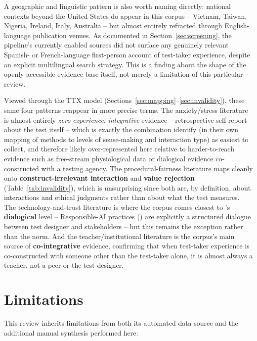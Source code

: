 \documentclass[11pt]{article}
\begin{document}
A geographic and linguistic pattern is also worth naming directly: national contexts beyond the United States do appear in this corpus -- Vietnam, Taiwan, Nigeria, Ireland, Italy, Australia -- but almost entirely refracted through English-language publication venues. As documented in Section~\ref{sec:screening}, the pipeline's currently enabled sources did not surface any genuinely relevant Spanish- or French-language first-person account of test-taker experience, despite an explicit multilingual search strategy. This is a finding about the shape of the openly accessible evidence base itself, not merely a limitation of this particular review.

Viewed through the TTX model (Sections~\ref{sec:mapping}--\ref{sec:invalidity}), these same four patterns reappear in more precise terms. The anxiety/stress literature is almost entirely \emph{zero-experience}, \emph{integrative} evidence -- retrospective self-report about the test itself -- which is exactly the combination \citet{araneda2025ttxmodel} identify (in their own mapping of methods to levels of sense-making and interaction type) as easiest to collect, and therefore likely over-represented here relative to harder-to-reach evidence such as free-stream physiological data or dialogical evidence co-constructed with a testing agency. The procedural-fairness literature maps cleanly onto \textbf{construct-irrelevant interaction} and \textbf{value rejection} (Table~\ref{tab:invalidity}), which is unsurprising since both are, by definition, about interactions and ethical judgments rather than about what the test measures. The technology-and-trust literature is where the corpus comes closest to \citeauthor{araneda2025ttxmodel}'s \textbf{dialogical} level -- Responsible-AI practices (\citet{burstein2024responsible}) are explicitly a structured dialogue between test designer and stakeholders -- but this remains the exception rather than the norm. And the teacher/institutional literature is the corpus's main source of \textbf{co-integrative} evidence, confirming that when test-taker experience is co-constructed with someone other than the test-taker alone, it is almost always a teacher, not a peer or the test designer.

\section{Limitations}
\label{sec:limitations}

This review inherits limitations from both its automated data source and the additional manual synthesis performed here:
\end{document}
